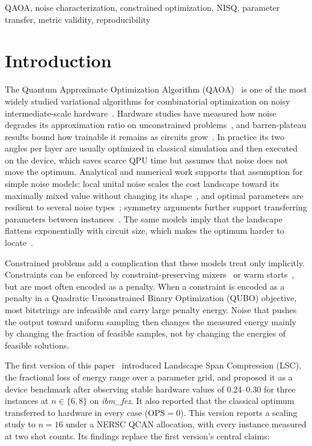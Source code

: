 \documentclass[conference]{IEEEtran}
\newcommand{\OPS}{\mathrm{OPS}}
\begin{document}
\begin{IEEEkeywords}
QAOA, noise characterization, constrained optimization, NISQ,
parameter transfer, metric validity, reproducibility
\end{IEEEkeywords}

\section{Introduction}
\label{sec:intro}

The Quantum Approximate Optimization Algorithm
(QAOA)~\cite{farhi2014quantum} is one of the most widely studied variational
algorithms for combinatorial optimization on noisy intermediate-scale
hardware~\cite{preskill2018quantum}. Hardware studies have measured how noise degrades its
approximation ratio on unconstrained problems~\cite{harrigan2021quantum, lotshaw2022empirical},
and barren-plateau results bound how trainable it remains as circuits
grow~\cite{mcclean2018barren}. In practice
its two angles per layer are usually optimized in classical simulation
and then executed on the device, which saves scarce QPU time but assumes
that noise does not move the optimum. Analytical and numerical work
supports that assumption for simple noise models: local unital noise
scales the cost landscape toward its maximally mixed value without
changing its shape~\cite{xue2019effects, marshall2020characterizing},
and optimal parameters are resilient to several noise
types~\cite{sharma2020noise}; symmetry arguments further support transferring parameters
between instances~\cite{shaydulin2023classical}. The same models imply that the landscape
flattens exponentially with circuit size, which makes the optimum
harder to locate~\cite{wang2021noise}.

Constrained problems add a complication that these models treat only
implicitly. Constraints can be enforced by constraint-preserving
mixers~\cite{bartschi2020grover} or warm starts~\cite{egger2021warm}, but are most often
encoded as a penalty. When a constraint is encoded as a penalty in a Quadratic
Unconstrained Binary Optimization (QUBO) objective, most bitstrings are
infeasible and carry large penalty energy. Noise that pushes the output
toward uniform sampling then changes the measured energy mainly by
changing the fraction of feasible samples, not by changing the energies
of feasible solutions.

The first version of this paper~\cite{meliksetian2026v1} introduced
Landscape Span Compression (LSC), the fractional loss of energy range
over a parameter grid, and proposed it as a device benchmark after
observing stable hardware values of 0.24--0.30 for three instances at
$n\in\{6,8\}$ on \textit{ibm\_fez}. It also reported that the classical
optimum transferred to hardware in every case ($\OPS{=}0$). This version
reports a scaling study to $n{=}16$ under a NERSC QCAN allocation, with
every instance measured at two shot counts. Its findings replace the
first version's central claims:
\end{document}
